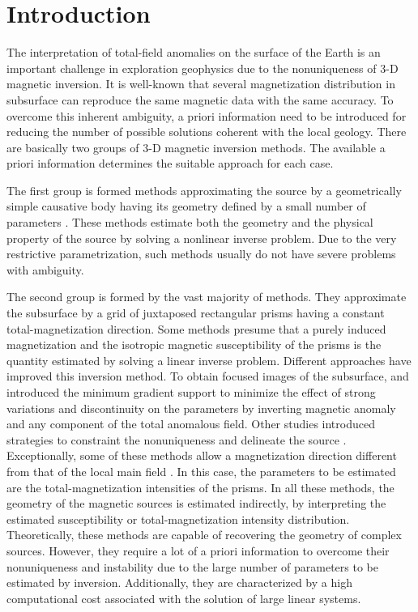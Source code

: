 \section{Introduction}

The interpretation of total-field anomalies on the surface of the Earth is an 
important challenge in exploration geophysics due to the nonuniqueness of 3-D magnetic 
inversion. It is well-known that several magnetization distribution in subsurface 
can reproduce the same magnetic data with the same accuracy. 
To overcome this inherent ambiguity, a priori information need to be introduced 
for reducing the number of possible solutions coherent with the local geology.
There are basically two groups of 3-D magnetic inversion methods. The available 
a priori information determines the suitable approach for each case.

The first group is formed methods approximating the source by a geometrically 
simple causative body having its geometry defined by a small number of parameters 
\citep[e.g., ][]{ballantyne-1980,bhattacharyya-1980,silva-1983}. These methods 
estimate both the geometry and the physical property of the source by solving 
a nonlinear inverse problem. Due to the very restrictive parametrization, 
such methods usually do not have severe problems with ambiguity.

The second group is formed by the vast majority of methods. 
They approximate the subsurface by a grid of juxtaposed rectangular prisms having 
a constant total-magnetization direction. Some methods presume that a purely induced 
magnetization \citep[e.g., ][]{cribb-1976,li_3-d_1996,pilkington_3-d_1997} and the 
isotropic magnetic susceptibility of the prisms is the quantity estimated by solving 
a linear inverse problem. Different approaches have improved this inversion method. To obtain focused images of the subsurface, \cite{portniaguine_focusing_1999} and \cite{portniaguine_3d_2002} introduced the minimum gradient support to minimize the effect of strong variations and discontinuity on the parameters by inverting magnetic anomaly and any component of the total anomalous field. Other studies introduced strategies to constraint the nonuniqueness and delineate the source \cite[]{tontini,pilkington_3d_2009,shamsipour_3d_2011,cella_inversion_2012,abedi-2015}. Exceptionally, some of these methods allow a magnetization direction 
different from that of the local main field \cite[e.g., ][]{pignatelli-2006}. 
In this case, the parameters to be estimated are the total-magnetization intensities 
of the prisms. 
In all these methods, the geometry of the magnetic sources is estimated indirectly, 
by interpreting the estimated susceptibility or total-magnetization intensity 
distribution. 
Theoretically, these methods are capable of recovering the geometry of complex 
sources. However, they require a lot of a priori information to overcome 
their nonuniqueness and instability due to the large number of parameters 
to be estimated by inversion. Additionally, they are characterized by a high 
computational cost associated with the solution of large linear systems.


